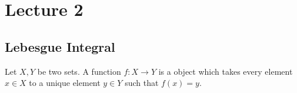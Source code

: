 \section{Lecture 2}
\subsection{Lebesgue Integral}

\begin{definition}[Function]
    \label{<+label+>}
    Let $X,Y$ be two sets. A function $f:X\to Y$ is a object which takes every element $x\in X$ to a unique element $y\in Y$ such that $f(x)=y$.
\end{definition}

